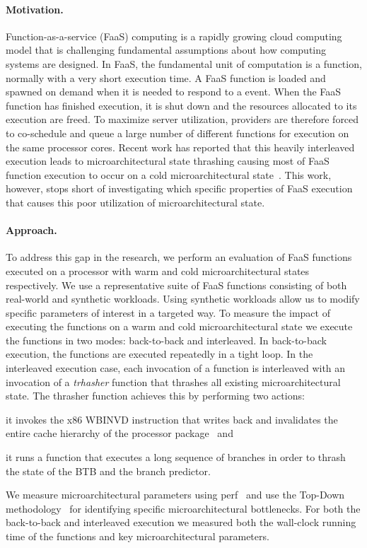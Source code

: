 \documentclass[../main.tex]{subfiles}
\begin{document}
\begin{refsection}
\paragraph{Motivation.} Function-as-a-service (FaaS) computing is a
rapidly growing cloud computing model that is challenging fundamental
assumptions about how computing systems are designed. In FaaS, the
fundamental unit of computation is a function, normally with a very
short execution time. A FaaS function is loaded and spawned on demand
when it is needed to respond to a event. When the FaaS function has
finished execution, it is shut down and the resources allocated to its
execution are freed. To maximize server utilization, providers are
therefore forced to co-schedule and queue a large number of different
functions for execution on the same processor cores. Recent work has
reported that this heavily interleaved execution leads to
microarchitectural state thrashing causing most of FaaS function
execution to occur on a cold microarchitectural
state~\cite{shahrad19_archit_implic_funct_servic_comput,lukewarm_serverless}. This
work, however, stops short of investigating which specific properties
of FaaS execution that causes this poor utilization of
microarchitectural state.

\paragraph{Approach.}
To address this gap in the research, we perform an evaluation of FaaS
functions executed on a processor with warm and cold
microarchitectural states respectively. We use a representative suite
of FaaS functions consisting of both real-world and synthetic
workloads. Using synthetic workloads allow us to modify specific
parameters of interest in a targeted way. To measure the impact of
executing the functions on a warm and cold microarchitectural state we
execute the functions in two modes: back-to-back and interleaved. In
back-to-back execution, the functions are executed repeatedly in a
tight loop. In the interleaved execution case, each invocation of a
function is interleaved with an invocation of a \emph{trhasher}
function that thrashes all existing microarchitectural state. The
thrasher function achieves this by performing two
actions: \begin{inparaenum}[1)]
\item it invokes the x86 WBINVD
  instruction that writes back and invalidates the entire cache
  hierarchy of the processor package~\cite[Chapter 6]{intelmanual} and \item it runs a function that
  executes a long sequence of branches in order to thrash the state of
  the BTB and the branch predictor. \end{inparaenum} We measure
microarchitectural parameters using perf~\cite{perftool} and use the Top-Down
methodology~\cite{yasin14_top_down} for identifying specific
microarchitectural bottlenecks. For both the back-to-back and
interleaved execution we measured both the wall-clock running time of
the functions and key microarchitectural parameters.



\end{refsection}
\end{document}

